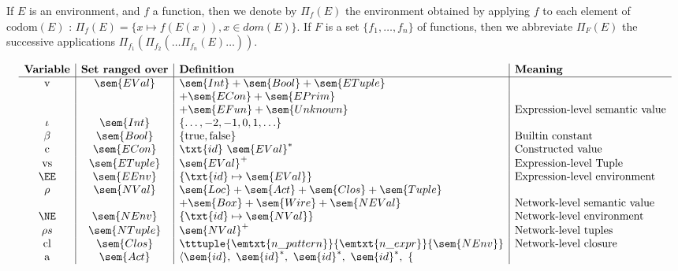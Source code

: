 If $E$ is an environment, and $f$ a function, then we denote by $\Pi_f(E)$ the environment obtained by
applying $f$ to each element of $\text{codom}(E)$ : $\Pi_f(E) = \lbrace x \mapsto f(E(x)), x \in
dom(E) \rbrace$. If $F$ is a set $\lbrace f_1, \ldots, f_n \rbrace$ of functions, then we abbreviate
$\Pi_F(E)$ the successive applications $\Pi_{f_1}(\Pi_{f_2}(\ldots \Pi_{f_n}(E)\ldots))$.

\begin{equation*}
  \renewcommand{\arraystretch}{1}
  \begin{array}[t]{c|c|l|l}
    \textbf{Variable}  & \textbf{Set ranged over}  &  \textbf{Definition} & \textbf{Meaning} \\\hline 
    \text{v}           & \sem{EVal}  & \sem{Int} + \sem{Bool} + \sem{ETuple} & \\
    &             & + \sem{ECon} + \sem{EPrim} & \\
    &             & + \sem{EFun} + \sem{Unknown} & \text{Expression-level semantic value} \\
    \iota              & \sem{Int}   & \lbrace \ldots, -2, -1, 0, 1, \ldots \rbrace & \\
    \beta              & \sem{Bool}  & \lbrace \text{true}, \text{false} \rbrace    & \text{Builtin constant} \\
    \text{c}           & \sem{ECon}  & \txt{id}~\sem{EVal}^* & \text{Constructed value} \\
    \text{vs}          & \sem{ETuple} & \sem{EVal}^{+} & \text{Expression-level Tuple} \\
    \EE                & \sem{EEnv}   & \lbrace \txt{id} \mapsto \sem{EVal} \rbrace & \text{Expression-level environment} \\
    \rho               & \sem{NVal} & \sem{Loc} + \sem{Act} + \sem{Clos} + \sem{Tuple} & \\
    &                 & + \sem{Box} + \sem{Wire} + \sem{NEVal} &  \text{Network-level semantic value} \\
    \NE                & \sem{NEnv}   & \lbrace \txt{id} \mapsto \sem{NVal} \rbrace & \text{Network-level environment} \\
    \rho s             & \sem{NTuple}  & \sem{NVal}^{+} & \text{Network-level tuples} \\
    \text{cl}          & \sem{Clos}   & \tttuple{\emtxt{n\_pattern}}{\emtxt{n\_expr}}{\sem{NEnv}} & \text{Network-level closure} \\
    \text{a}           & \sem{Act} & \langle \sem{id},~\sem{id}^*, ~\sem{id}^*,~\sem{id}^*, ~\lbrace

\end{array}
\end{equation*}
